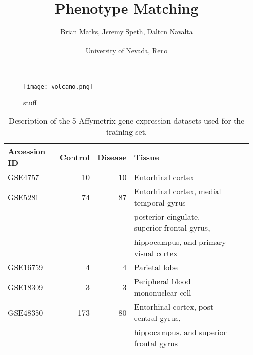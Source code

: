 \documentclass{sig-alternate}
\begin{document}
\title{Phenotype Matching}
\author{Brian Marks, Jeremy Speth, Dalton Navalta \\\\ University of Nevada, Reno}
\date{}

\maketitle
\begin{abstract}
 
\end{abstract}

\category{}{}{}


\terms{}

\keywords{}

\section{}


\section{}


\subsection{}


\begin{figure}
	
	\centering 
		\texttt{[image: volcano.png]}
	\caption {stuff}
\label{fig:volcano}

\end{figure}




\begin{table*}[htbp!]
\centering
\scriptsize
\caption{Description of the 5 Affymetrix gene expression datasets used for the training set. %
}
\begin{tabular}{lrrlll}
    \toprule
    Accession ID&Control&Disease&Tissue\\
    \toprule
    GSE4757&10&10&Entorhinal cortex\\
    GSE5281&74&87&Entorhinal cortex, medial temporal gyrus\\
    &&&posterior cingulate, superior frontal gyrus,\\
    &&&hippocampus, and primary visual cortex\\
    GSE16759&4&4&Parietal lobe\\
    GSE18309&3&3&Peripheral blood mononuclear cell\\
   GSE48350&173&80&Entorhinal cortex, post-central gyrus, \\
   &&&hippocampus, and superior frontal gyrus\\
	
    \bottomrule
\end{tabular}
\label{tab:TrainingData}%
\end{table*}
\end{document}
